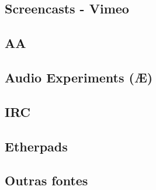 \subsection{Screencasts - Vimeo}

\subsection{AA}

\subsection{Audio Experiments (Æ)}

\subsection{IRC}

\subsection{Etherpads}

\subsection{Outras fontes}